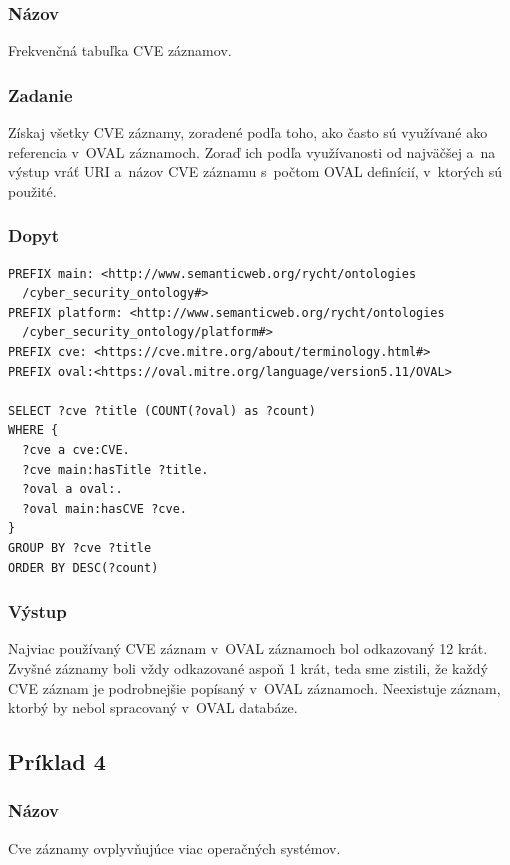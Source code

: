 \documentclass[12pt, a4paper, oneside]{book}
\begin{document}
\subsubsection*{Názov}
Frekvenčná tabuľka CVE záznamov.

\subsubsection*{Zadanie}
Získaj všetky CVE záznamy, zoradené podľa toho, ako často sú využívané ako referencia v~OVAL záznamoch. Zoraď ich podľa využívanosti od najväčšej a~na výstup vráť URI a~názov CVE záznamu s~počtom OVAL definícií, v~ktorých sú použité.

\subsubsection*{Dopyt}
\begin{small}
\begin{verbatim}
PREFIX main: <http://www.semanticweb.org/rycht/ontologies
  /cyber_security_ontology#>
PREFIX platform: <http://www.semanticweb.org/rycht/ontologies
  /cyber_security_ontology/platform#>
PREFIX cve: <https://cve.mitre.org/about/terminology.html#>
PREFIX oval:<https://oval.mitre.org/language/version5.11/OVAL>

SELECT ?cve ?title (COUNT(?oval) as ?count)
WHERE {
  ?cve a cve:CVE.
  ?cve main:hasTitle ?title.
  ?oval a oval:.
  ?oval main:hasCVE ?cve.
} 
GROUP BY ?cve ?title
ORDER BY DESC(?count)
\end{verbatim}
\end{small}


\subsubsection*{Výstup}
Najviac používaný CVE záznam v~OVAL záznamoch bol odkazovaný 12 krát. Zvyšné záznamy boli vždy odkazované aspoň 1 krát, teda sme zistili, že každý CVE záznam je podrobnejšie popísaný v~OVAL záznamoch. Neexistuje záznam, ktorbý by nebol spracovaný v~OVAL databáze.


\subsection*{Príklad 4}
\label{sec:priklad4}
\subsubsection*{Názov}
Cve záznamy ovplyvňujúce viac operačných systémov.
\end{document}

